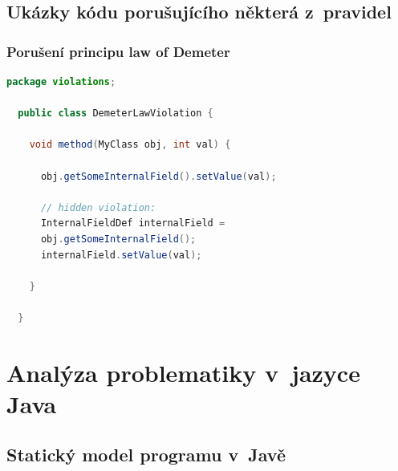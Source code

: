 \subsection{Ukázky kódu porušujícího některá z~pravidel}

\subsubsection{Porušení principu law of Demeter}

\begin{lstlisting}[language=java]
  package violations;

  public class DemeterLawViolation {

    void method(MyClass obj, int val) {

      obj.getSomeInternalField().setValue(val);

      // hidden violation:
      InternalFieldDef internalField =
      obj.getSomeInternalField();
      internalField.setValue(val);

    }

  }
\end{lstlisting}

\section{Analýza problematiky v~jazyce Java}

\subsection{Statický model programu v~Javě}


